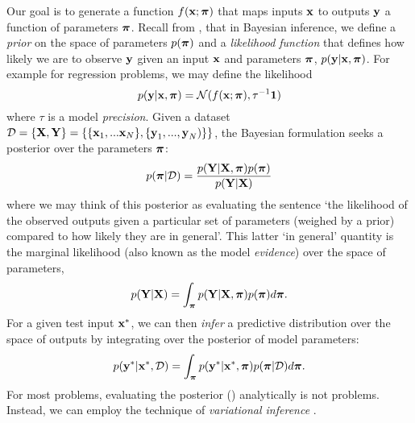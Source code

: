 Our goal is to generate a function $f(\boldsymbol{\mathbf{x}}; \boldsymbol{\mathbf{\pi}})$ that maps inputs $\boldsymbol{\mathbf{x}}$ to outputs $\boldsymbol{\mathbf{y}}$ a function of parameters $\boldsymbol{\mathbf{\pi}}$. Recall from , that in Bayesian inference, we define a \textit{prior} on the space of parameters $p(\boldsymbol{\mathbf{\pi}})$ and a \textit{likelihood function} that defines how likely we are to observe $\boldsymbol{\mathbf{y}}$ given an input $\boldsymbol{\mathbf{x}}$ and parameters $\boldsymbol{\mathbf{\pi}}$, $p(\boldsymbol{\mathbf{y}} | \boldsymbol{\mathbf{x}}, \boldsymbol{\mathbf{\pi}})$. For example for regression problems, we may define the likelihood
\begin{equation}
	p(\boldsymbol{\mathbf{y}} | \boldsymbol{\mathbf{x}}, \boldsymbol{\mathbf{\pi}}) = \mathcal{N}(f(\boldsymbol{\mathbf{x}}; \boldsymbol{\mathbf{\pi}}),\tau^{-1}\boldsymbol{\mathbf{1}})
\end{equation}
where $\tau$ is a model \textit{precision}. Given a dataset $\mathcal{D} = \{\boldsymbol{\mathbf{X}}, \boldsymbol{\mathbf{Y}}\} = \{\{\boldsymbol{\mathbf{x}}_1, ... \boldsymbol{\mathbf{x}}_N\},\{\boldsymbol{\mathbf{y}}_1, ..., \boldsymbol{\mathbf{y}}_N)\} \}$, the Bayesian formulation seeks a posterior over the parameters $\boldsymbol{\mathbf{\pi}}$:
\begin{equation}
\label{eq:sun_bcnn_param_posterior}
	p(\boldsymbol{\mathbf{\pi}} | \mathcal{D}) = \frac{p(\boldsymbol{\mathbf{Y}}|\boldsymbol{\mathbf{X}}, \boldsymbol{\mathbf{\pi}}) p(\boldsymbol{\mathbf{\pi}})}{p(\boldsymbol{\mathbf{Y}} | \boldsymbol{\mathbf{X}})}
\end{equation}
where we may think of this posterior as evaluating the sentence `the likelihood of the observed outputs given a particular set of parameters (weighed by a prior) compared to how likely they are in general'. This latter `in general' quantity is the marginal likelihood (also known as the model \textit{evidence}) over the space of parameters,
\begin{equation}
	p(\boldsymbol{\mathbf{Y}} | \boldsymbol{\mathbf{X}}) = \int_{\boldsymbol{\mathbf{\pi}}}  p(\boldsymbol{\mathbf{Y}} | \boldsymbol{\mathbf{X}}, \boldsymbol{\mathbf{\pi}}) p(\boldsymbol{\mathbf{\pi}}) d\boldsymbol{\mathbf{\pi}}.
\end{equation}
For a given test input $\boldsymbol{\mathbf{x}}^*$, we can then \textit{infer} a predictive distribution over the space of outputs by integrating over the posterior of model parameters:
\begin{equation}
	p(\boldsymbol{\mathbf{y}}^* | \boldsymbol{\mathbf{x}}^*, \mathcal{D}) = \int_{\boldsymbol{\mathbf{\pi}}}  p(\boldsymbol{\mathbf{y}}^* | \boldsymbol{\mathbf{x}}^*, \boldsymbol{\mathbf{\pi}}) p(\boldsymbol{\mathbf{\pi}} | \mathcal{D}) d\boldsymbol{\mathbf{\pi}}.
\end{equation}
For most problems, evaluating the posterior () analytically is not problems. Instead, we can employ the technique of \textit{variational inference} \citep{Gal2016UncertaintyThesis}.

